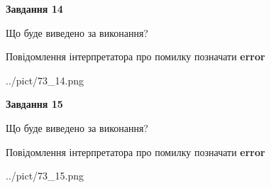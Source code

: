 \documentclass[11pt, ukrainian]{article}
\begin{document}
{\begin {large}
{\begin {center}\textbf{Завдання 14}\end {center}}\par
Що буде виведено за виконання? \par
Повідомлення інтерпретатора про помилку позначати \textbf{error}

\begin{center}
	{../pict/73_14.png}
\end{center}
\newpage

{\begin {center}\textbf{Завдання 15}\end {center}}\par
Що буде виведено за виконання? \par
Повідомлення інтерпретатора про помилку позначати \textbf{error}

\begin{center}
	{../pict/73_15.png}
\end{center}
\newpage

\end {large}}
\end{document}
